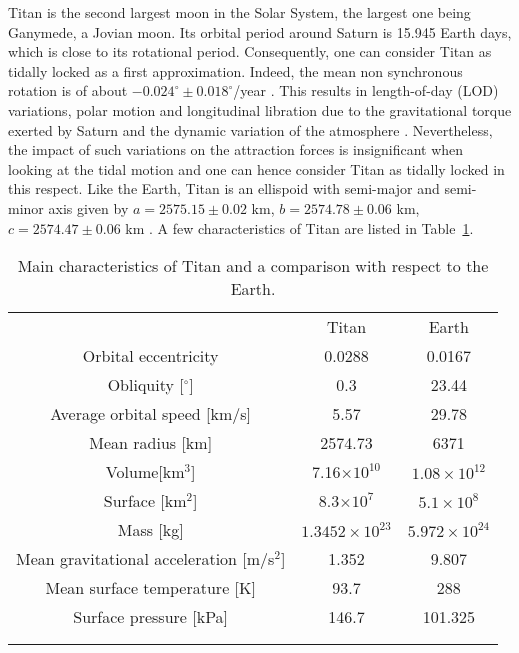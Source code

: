 Titan is the second largest moon in the Solar System, the largest one being Ganymede, a Jovian moon. Its orbital period around Saturn is 15.945 Earth days, which is close to its rotational period. Consequently, one can consider Titan as tidally locked as a first approximation. Indeed, the mean non synchronous rotation is of about $-0.024^\circ\pm0.018^\circ$/year \citep{meriggiola2016rotational}. This results in length-of-day (LOD) variations, polar motion and longitudinal libration due to the gravitational torque exerted by Saturn and the dynamic variation of the atmosphere \citep{coyette2018variations}. Nevertheless, the impact of such variations on the attraction forces is insignificant when looking at the tidal motion and one can hence consider Titan as tidally locked in this respect. Like the Earth, Titan is an ellispoid with semi-major and semi-minor axis given by $a =2575.15\pm0.02$ km, $b =2574.78\pm0.06$ km, $c =2574.47\pm0.06$ km \citep{zebker2009size}. A few characteristics of Titan are listed in Table~\ref{tab:intro:charac}. 
\begin{table}
\centering
\begin{threeparttable}
\caption{Main characteristics of Titan and a comparison with respect to the Earth. \label{tab:intro:charac}}
\begin{tabular}{ccc} \hline\noalign{\smallskip}

{}&{Titan}&{Earth} \\ \noalign{\smallskip}\hline\noalign{\smallskip}

{Orbital eccentricity}&{0.0288} &{0.0167}\\ 
{Obliquity [$^\circ$]}&{0.3} &{23.44}\\ 
{Average orbital speed [km/s]}&{5.57} &{29.78}\\ 
{Mean radius [km]} &{2574.73}&{6371} \\ 
{Volume[km$^3$]}&{7.16$\times10^{10}$} &{$1.08\times10^{12}$}\\ 
{Surface [km$^2$]}&{8.3$\times10^7$} &{$5.1\times10^8$}\\ 
{Mass [kg]}&{$1.3452\times10^{23}$} &{$5.972\times10^{24}$}\\
{Mean gravitational acceleration [m/s$^{2}$]}&{1.352} &{9.807}\\
{Mean surface temperature [K]}&{93.7} &{288}\\
{Surface pressure [kPa]}&{146.7} &{101.325}\\
 \\\noalign{\smallskip}\hline
\end{tabular}
\end{threeparttable}
\end{table}

